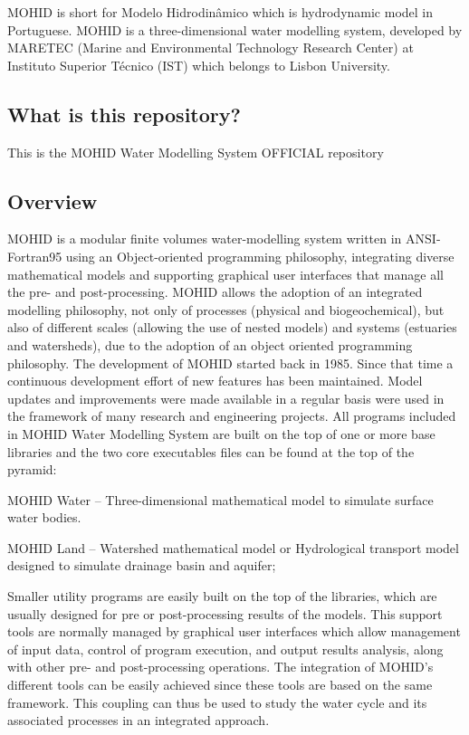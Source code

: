 M\+O\+H\+ID is short for Modelo Hidrodinâmico which is hydrodynamic model in Portuguese. M\+O\+H\+ID is a three-\/dimensional water modelling system, developed by M\+A\+R\+E\+T\+EC (Marine and Environmental Technology Research Center) at Instituto Superior Técnico (I\+ST) which belongs to Lisbon University.

\subsection*{What is this repository?}

This is the M\+O\+H\+ID Water Modelling System O\+F\+F\+I\+C\+I\+AL repository

\subsection*{Overview}

M\+O\+H\+ID is a modular finite volumes water-\/modelling system written in A\+N\+S\+I-\/\+Fortran95 using an Object-\/oriented programming philosophy, integrating diverse mathematical models and supporting graphical user interfaces that manage all the pre-\/ and post-\/processing. M\+O\+H\+ID allows the adoption of an integrated modelling philosophy, not only of processes (physical and biogeochemical), but also of different scales (allowing the use of nested models) and systems (estuaries and watersheds), due to the adoption of an object oriented programming philosophy. The development of M\+O\+H\+ID started back in 1985. Since that time a continuous development effort of new features has been maintained. Model updates and improvements were made available in a regular basis were used in the framework of many research and engineering projects. All programs included in M\+O\+H\+ID Water Modelling System are built on the top of one or more base libraries and the two core executables files can be found at the top of the pyramid\+:
\begin{DoxyItemize}
\item M\+O\+H\+ID Water – Three-\/dimensional mathematical model to simulate surface water bodies.
\item M\+O\+H\+ID Land – Watershed mathematical model or Hydrological transport model designed to simulate drainage basin and aquifer;
\end{DoxyItemize}

Smaller utility programs are easily built on the top of the libraries, which are usually designed for pre or post-\/processing results of the models. This support tools are normally managed by graphical user interfaces which allow management of input data, control of program execution, and output results analysis, along with other pre-\/ and post-\/processing operations. The integration of M\+O\+H\+I\+D’s different tools can be easily achieved since these tools are based on the same framework. This coupling can thus be used to study the water cycle and its associated processes in an integrated approach.

